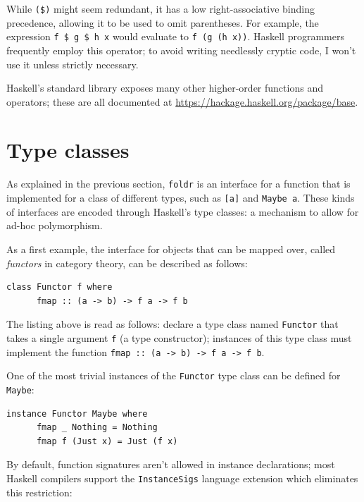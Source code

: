 \documentclass[UdineBachThesis,american,11pt]{PhdThesis}
\begin{document}
  While \mbox{\texttt{(\$)}} might seem redundant, it has a low
  right-associative binding precedence, allowing it to be used to omit
  parentheses. For example, the expression \mbox{\texttt{f \$ g \$ h x}} would
  evaluate to \mbox{\texttt{f (g (h x))}}. Haskell programmers frequently employ
  this operator; to avoid writing needlessly cryptic code, I won't use it unless
  strictly necessary.

  Haskell's standard library exposes many other higher-order functions and
  operators; these are all documented at
  \url{https://hackage.haskell.org/package/base}.

  \section{Type classes}

  As explained in the previous section, \mbox{\texttt{foldr}} is an interface
  for a function that is implemented for a class of different types, such as
  \mbox{\texttt{[a]}} and \mbox{\texttt{Maybe a}}. These kinds of interfaces are
  encoded through Haskell's type classes: a mechanism to allow for ad-hoc
  polymorphism.

  As a first example, the interface for objects that can be mapped over, called
  \emph{functors} in category theory, can be described as follows:

  \begin{Verbatim}[gobble=4,fontsize=\small]
    class Functor f where
      fmap :: (a -> b) -> f a -> f b
  \end{Verbatim}

  The listing above is read as follows: declare a type class named
  \mbox{\texttt{Functor}} that takes a single argument \texttt{f} (a type
  constructor); instances of this type class must implement the function
  \mbox{\texttt{fmap :: (a -> b) -> f a -> f b}}.

  One of the most trivial instances of the \mbox{\texttt{Functor}} type class
  can be defined for \mbox{\texttt{Maybe}}:

  \begin{Verbatim}[gobble=4,fontsize=\small]
    instance Functor Maybe where
      fmap _ Nothing = Nothing
      fmap f (Just x) = Just (f x)
  \end{Verbatim}

  By default, function signatures aren't allowed in instance declarations; most
  Haskell compilers support the \mbox{\texttt{InstanceSigs}} language extension
  which eliminates this restriction:
\end{document}
